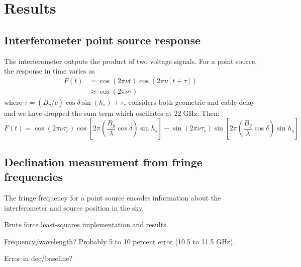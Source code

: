\documentclass[10pt]{article}
\newcommand {\mt}{\mathrm}
\newcommand {\unit}[1]{\; \mt{#1}}
\begin{document}
\section{Results}

\subsection{Interferometer point source response}

The interferometer outputs the product of two voltage signals.  For a point source, the response in time varies as
\begin{align*}
	F(t) &= \cos(2\pi\nu t) \cos\left(2\pi\nu \left[ t + \tau \right] \right) \\
		 &\approx \cos\left(2\pi\nu \tau\right)
\end{align*}
where $\tau = (B_y / c) \cos\delta \sin(h_s) + \tau_c$ considers both geometric and cable delay and we have dropped the sum term which oscillates at $22 \unit{GHz}$.
Then:
\[
	F(t) = \cos(2\pi\nu\tau_c)
			\cos \left[2\pi \left(\frac{B_y}{\lambda}\cos\delta\right)
			           \sin h_s \right]
			- \sin(2\pi\nu\tau_c)
			\sin \left[2\pi \left(\frac{B_y}{\lambda}\cos\delta\right)
			           \sin h_s \right]
\]

\subsection{Declination measurement from fringe frequencies}

The fringe frequency for a point source encodes information about the interferometer and source position in the sky.

Brute force least-squares implementation and results.

Frequency/wavelength? Probably 5 to 10 percent error (10.5 to 11.5 GHz).

Error in dec/baseline?
\end{document}
